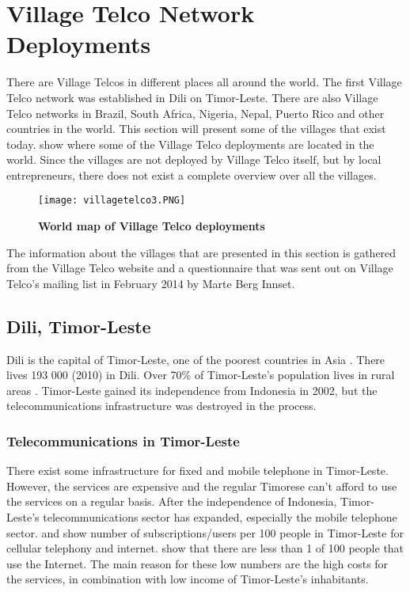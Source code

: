 \section{Village Telco Network Deployments} \label{sec:deployments}
There are Village Telcos in different places all around the world. The first Village Telco network was established in Dili on Timor-Leste. There are also Village Telco networks in Brazil, South Africa, Nigeria, Nepal, Puerto Rico and other countries in the world. This section will present some of the villages that exist today.  show where some of the Village Telco deployments are located in the world. Since the villages are not deployed by Village Telco itself, but by local entrepreneurs, there does not exist a complete overview over all the villages. 


\begin{figure}[H]
\centering
\texttt{[image: villagetelco3.PNG]}
\caption [World map of Village Telco deployments]{\textbf{World map of Village Telco deployments}}
\label{fig:mapdeployments}
\end{figure}

The information about the villages that are presented in this section is gathered from the Village Telco website \cite{villagetelcodeployments} and a questionnaire that was sent out on Village Telco's mailing list in February 2014 by Marte Berg Innset.

\subsection{Dili, Timor-Leste}\label{sec:timor}
Dili is the capital of Timor-Leste, one of the poorest countries in Asia \cite{vtdili}. There lives 193 000 (2010) in Dili. Over 70\% of Timor-Leste's population lives in rural areas \cite{quandltimor}.  Timor-Leste gained its independence from Indonesia in 2002, but the telecommunications infrastructure was destroyed in the process. 


\subsubsection{Telecommunications in Timor-Leste}
There exist some infrastructure for fixed and mobile telephone in Timor-Leste. However, the services are expensive and the regular Timorese can't afford to use the services on a regular basis. After the independence of Indonesia, Timor-Leste's telecommunications sector has expanded, especially the mobile telephone sector.  and  show number of subscriptions/users per 100 people in Timor-Leste for cellular telephony and internet.  show that there are less than 1 of 100 people that use the Internet. The main reason for these low numbers are the high costs for the services, in combination with low income of Timor-Leste's inhabitants. 


